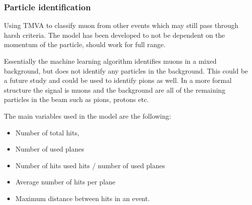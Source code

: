 






\clearpage
\subsubsection{Particle identification}

Using TMVA to classify muon from other events which may still pass through harsh criteria. The model has been developed to not be dependent on the momentum of the particle, should work for full range.

Essentially the machine learning algorithm identifies muons in a mixed background, but does not identify any particles in the background. This could be a future study and could be used to identify pions as well. In a more formal structure the signal is muons and the background are all of the remaining particles in the beam such as pions, protons etc.

The main variables used in the model are the following:
\begin{itemize}
\item Number of total hits,
\item Number of used planes
\item Number of hits used hits / number of used planes
\item Average number of hits per plane
\item Maximum distance between hits in an event.
\end{itemize}

